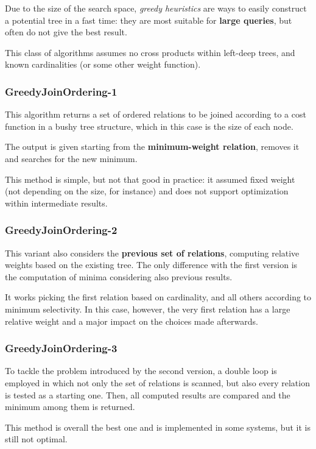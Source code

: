 Due to the size of the search space, \textit{greedy heuristics} are ways to easily construct a potential tree in a fast time: they are most suitable for \textbf{large queries}, but often do not give the best result.

This class of algorithms assumes no cross products within left-deep trees, and known cardinalities (or some other weight function).

\subsubsection{GreedyJoinOrdering-1}
This algorithm returns a set of ordered relations to be joined according to a cost function in a bushy tree structure, which in this case is the size of each node. 

The output is given starting from the \textbf{minimum-weight relation}, removes it and searches for the new minimum. 

This method is simple, but not that good in practice: it assumed fixed weight (not depending on the size, for instance) and does not support optimization within intermediate results. 

\subsubsection{GreedyJoinOrdering-2}
This variant also considers the \textbf{previous set of relations}, computing relative weights based on the existing tree. The only difference with the first version is the computation of minima considering also previous results.

It works picking the first relation based on cardinality, and all others according to minimum selectivity. In this case, however, the very first relation has a large relative weight and a major impact on the choices made afterwards. 

\subsubsection{GreedyJoinOrdering-3}
To tackle the problem introduced by the second version, a double loop is employed in which not only the set of relations is scanned, but also every relation is tested as a starting one. Then, all computed results are compared and the minimum among them is returned. 

This method is overall the best one and is implemented in some systems, but it is still not optimal.

